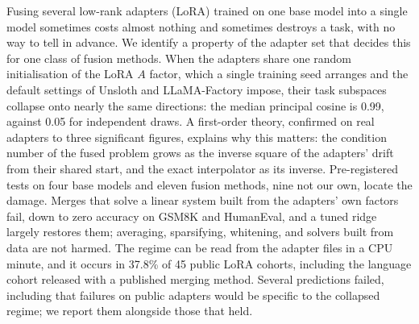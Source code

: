 Fusing several low-rank adapters (LoRA) trained on one base model into a
single model sometimes costs almost nothing and sometimes destroys a task,
with no way to tell in advance. We identify a property of the adapter set
that decides this for one class of fusion methods. When the adapters
share one random initialisation of the LoRA $A$ factor, which a single
training seed arranges and the default settings of Unsloth and LLaMA-Factory
impose, their task subspaces collapse onto nearly the same directions: the
median principal cosine is 0.99, against 0.05 for independent draws. A
first-order theory, confirmed on real adapters to three significant figures,
explains why this matters: the condition number of the fused problem grows as
the inverse square of the adapters' drift from their shared start, and the
exact interpolator as its inverse. Pre-registered tests on four base models
and eleven fusion methods, nine not our own, locate the damage.
Merges that solve a linear system built from the adapters' own factors fail,
down to zero accuracy on GSM8K and HumanEval, and a tuned ridge largely
restores them; averaging, sparsifying, whitening, and solvers built from data
are not harmed. The regime can be read from the adapter files in
a CPU minute, and it occurs in 37.8\% of 45 public LoRA cohorts,
including the language cohort released with a published merging method.
Several predictions failed, including that failures on public adapters would
be specific to the collapsed regime; we report them alongside those that held.
